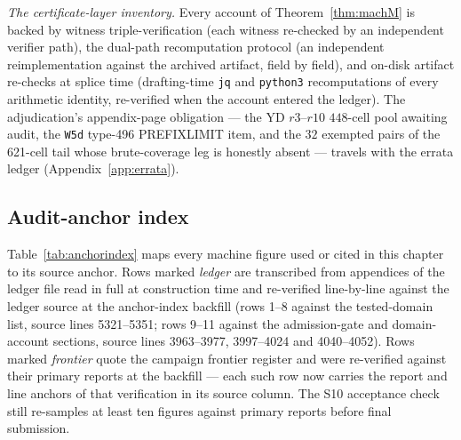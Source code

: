 \emph{The certificate-layer inventory.} Every account of
Theorem~\ref{thm:machM} is backed by witness triple-verification (each
witness re-checked by an independent verifier path), the dual-path
recomputation protocol (an independent reimplementation against the archived
artifact, field by field), and on-disk artifact re-checks at splice time
(drafting-time \texttt{jq} and \texttt{python3} recomputations of every
arithmetic identity, re-verified when the account entered the ledger). The
adjudication's appendix-page obligation --- the YD $r3$--$r10$ $448$-cell
pool awaiting audit, the \texttt{W5d} type-496 PREFIXLIMIT item, and the
$32$ exempted pairs of the 621-cell tail whose brute-coverage leg is
honestly absent --- travels with the errata ledger
(Appendix~\ref{app:errata}).

\subsection{Audit-anchor index}\label{subsec:machindex}

Table~\ref{tab:anchorindex} maps every machine figure used or cited in this chapter to its
source anchor. Rows marked \emph{ledger} are transcribed from appendices of the ledger
file read in full at construction time and re-verified line-by-line against the ledger
source at the anchor-index backfill (rows 1--8 against the tested-domain list,
source lines 5321--5351; rows 9--11 against the admission-gate and domain-account
sections, source lines 3963--3977, 3997--4024 and 4040--4052). Rows marked
\emph{frontier} quote the campaign frontier register and were re-verified against
their primary reports at the backfill --- each such row now carries the report and
line anchors of that verification in its source column. The S10 acceptance check
still re-samples at least ten figures against primary reports before final submission.


